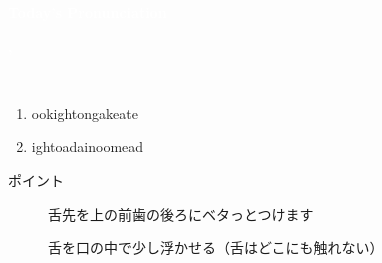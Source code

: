 \documentclass[aspectratio=169,xcolor={dvipsnames,table}]{beamer}
\begin{document}
\begin{frame}
\centering
  \textcolor{white}{\Huge\bfseries Today's Pronunciation}\pause

 \vspace{30pt}

  \textcolor{white}{\Huge\bfseries {}, }
\end{frame}
\begin{frame}[plain]{\,\,\,}

\large

\begin{enumerate}
 \item  {}\hspace{20pt}ook\hspace{1\zw}ight\hspace{1\zw}ong\hspace{1\zw}ake\hspace{1\zw}ate
 \item  {}\hspace{20pt}ight\hspace{1\zw}oad\hspace{1\zw}ain\hspace{1\zw}oom\hspace{1\zw}ead
\end{enumerate}

\vspace*{20pt}

\normalsize
ポイント

\begin{description}
 \item[] 舌先を上の前歯の後ろにベタっとつけます
 \item[] 舌を口の中で少し浮かせる（舌はどこにも触れない）
\end{description}
\hfill{}
\end{frame}
\end{document}
